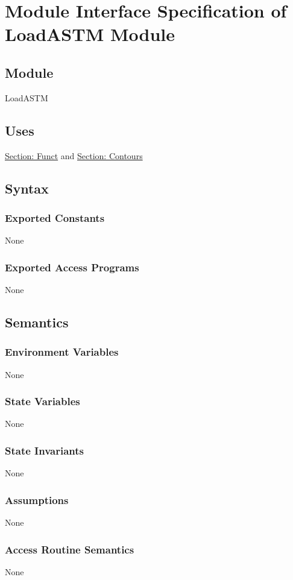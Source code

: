 \documentclass[12pt]{article}
\begin{document}
\section{Module Interface Specification of LoadASTM Module}
\label{Sec:LoadASTM}
\subsection{Module}
\label{Sec:Module}
LoadASTM
\subsection{Uses}
\label{Sec:Uses}
\hyperref[Sec:FunctADT]{Section: Funct} and \hyperref[Sec:ContoursADT]{Section: Contours}
\subsection{Syntax}
\label{Sec:Syntax}
\subsubsection{Exported Constants}
\label{Sec:ExpConstants}
None
\subsubsection{Exported Access Programs}
\label{Sec:ExpAccPrograms}
None
\subsection{Semantics}
\label{Sec:Semantics}
\subsubsection{Environment Variables}
\label{Sec:EnviroVars}
None
\subsubsection{State Variables}
\label{Sec:StateVars}
None
\subsubsection{State Invariants}
\label{Sec:StateInvars}
None
\subsubsection{Assumptions}
\label{Sec:Assumps}
None
\subsubsection{Access Routine Semantics}
\label{Sec:AccRoutSemantics}
None
\end{document}

